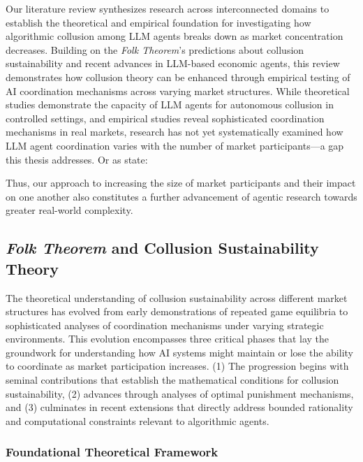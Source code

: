 Our literature review synthesizes research across interconnected domains to establish the theoretical and empirical foundation for investigating how algorithmic collusion among LLM agents breaks down as market concentration decreases. Building on the \emph{Folk Theorem}'s predictions about collusion sustainability and recent advances in LLM-based economic agents, this review demonstrates how collusion theory can be enhanced through empirical testing of AI coordination mechanisms across varying market structures. While theoretical studies demonstrate the capacity of LLM agents for autonomous collusion in controlled settings, and empirical studies reveal sophisticated coordination mechanisms in real markets, research has not yet systematically examined how LLM agent coordination varies with the number of market participants---a gap this thesis addresses. Or as \textcite[p.24]{fish_algorithmic_2025} state:
\begin{displayquote}
\end{displayquote}

Thus, our approach to increasing the size of market participants and their impact on one another also constitutes a further advancement of agentic research towards greater real-world complexity.

\subsection{\emph{Folk Theorem} and Collusion Sustainability Theory}

The theoretical understanding of collusion sustainability across different market structures has evolved from early demonstrations of repeated game equilibria to sophisticated analyses of coordination mechanisms under varying strategic environments. This evolution encompasses three critical phases that lay the groundwork for understanding how AI systems might maintain or lose the ability to coordinate as market participation increases. (1) The progression begins with seminal contributions that establish the mathematical conditions for collusion sustainability, (2) advances through analyses of optimal punishment mechanisms, and (3) culminates in recent extensions that directly address bounded rationality and computational constraints relevant to algorithmic agents.

\subsubsection*{Foundational Theoretical Framework}

